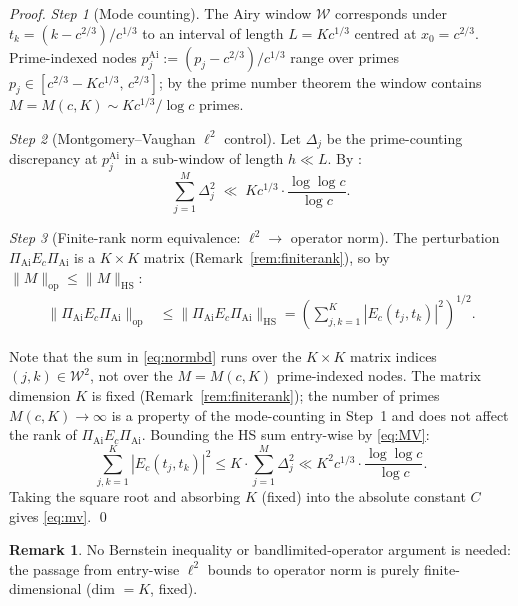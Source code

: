 \documentclass[12pt,a4paper]{amsart}
\theoremstyle{definition}
\newtheorem{remark}[theorem]{Remark}
\newcommand{\PAi}{\Pi_{\mathrm{Ai}}}
\newcommand{\Ec}{E_c}
\newcommand{\norm}[1]{\|#1\|}
\begin{document}
\begin{proof}

\emph{Step 1} (Mode counting).
The Airy window $\mathcal{W}$ corresponds under $t_k = (k-c^{2/3})/c^{1/3}$
to an interval of length $L = Kc^{1/3}$ centred at $x_0 = c^{2/3}$.
Prime-indexed nodes $p_j^{\mathrm{Ai}} := (p_j - c^{2/3})/c^{1/3}$
range over primes $p_j \in [c^{2/3}-Kc^{1/3},\,c^{2/3}]$;
by the prime number theorem the window contains $M = M(c,K) \sim Kc^{1/3}/\log c$
primes.

\emph{Step 2} (Montgomery--Vaughan $\ell^2$ control).
Let $\Delta_j$ be the prime-counting discrepancy at $p_j^{\mathrm{Ai}}$
in a sub-window of length $h \ll L$.
By \cite[Theorem~7.3]{MV1974}:
\begin{equation}\label{eq:MV}
  \sum_{j=1}^{M} \Delta_j^2
  \;\ll\; Kc^{1/3}\cdot\frac{\log\log c}{\log c}.
\end{equation}

\emph{Step 3} (Finite-rank norm equivalence: $\ell^2 \to$ operator norm).
The perturbation $\PAi\Ec\PAi$ is a $K\times K$ matrix
(Remark~\ref{rem:finiterank}), so by $\norm{M}_{\mathrm{op}} \le \norm{M}_{\mathrm{HS}}$:
\begin{align}\label{eq:normbd}
  \norm{\PAi\Ec\PAi}_{\mathrm{op}}
  &\le \norm{\PAi\Ec\PAi}_{\mathrm{HS}}
   = \left(\sum_{j,k=1}^{K} |E_c(t_j,t_k)|^2\right)^{1/2}.
\end{align}


Note that the sum in \eqref{eq:normbd} runs over the $K\times K$
matrix indices $(j,k) \in \mathcal{W}^2$, not over the $M = M(c,K)$
prime-indexed nodes.
The matrix dimension $K$ is fixed (Remark~\ref{rem:finiterank});
the number of primes $M(c,K) \to \infty$ is a property of the
mode-counting in Step~1 and does not affect the rank of $\PAi\Ec\PAi$.
Bounding the HS sum entry-wise by \eqref{eq:MV}:
\[
  \sum_{j,k=1}^{K} |E_c(t_j,t_k)|^2
  \le K \cdot \sum_{j=1}^{M}\Delta_j^2
  \ll K^2 c^{1/3} \cdot \frac{\log\log c}{\log c}.
\]
Taking the square root and absorbing $K$ (fixed) into the absolute
constant $C$ gives \eqref{eq:mv}. \qed
\end{proof}

\begin{remark}
No Bernstein inequality or bandlimited-operator argument is needed:
the passage from entry-wise $\ell^2$ bounds to operator norm
is purely finite-dimensional (dim $= K$, fixed).
\end{remark}
\end{document}
